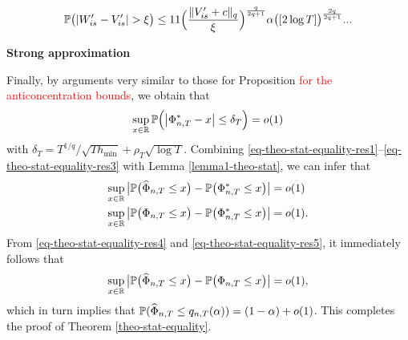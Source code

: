 \documentclass[a4paper,12pt]{article}
\begin{document}
\begin{align*}
\mathbb{P}\big(|W_{is}^\prime - V_{is}^\prime| > \xi \big) \le 11 \Big(\frac{\lVert V_{is}^\prime + c\rVert_q}{\xi}\Big)^{\frac{q}{2q+1}}\alpha\big([2\log T]\big)^{\frac{2q}{2q+1}}...
\end{align*}


\textbf{Strong approximation}

Finally, by arguments very similar to those for Proposition \textcolor{red}{for the anticoncentration bounds}, we obtain that 
\begin{equation}\label{eq-theo-stat-equality-res4}
\sup_{x \in \mathbb{R}} \mathbb{P} \Big( \big| \Phi_{n,T}^* - x \big| \le \delta_T \Big) = o(1) 
\end{equation}
with $\delta_T = T^{1/q} / \sqrt{T h_{\min}} + \rho_T \sqrt{\log T}$. Combining \eqref{eq-theo-stat-equality-res1}--\eqref{eq-theo-stat-equality-res3} with Lemma \ref{lemma1-theo-stat}, we can infer that 
\begin{align}
\sup_{x \in \mathbb{R}} \big| \mathbb{P} \big( \widehat{\Phi}_{n,T} \le x \big) -  \mathbb{P} \big( \Phi_{n,T}^* \le x \big) \big| & = o(1) \label{eq-theo-stat-equality-res4} \\
\sup_{x \in \mathbb{R}} \big| \mathbb{P} \big( \Phi_{n,T} \le x \big) -  \mathbb{P} \big( \Phi_{n,T}^* \le x \big) \big| & = o(1). \label{eq-theo-stat-equality-res5}
\end{align}
From \eqref{eq-theo-stat-equality-res4} and \eqref{eq-theo-stat-equality-res5}, it immediately follows that 
\[ \sup_{x \in \mathbb{R}} \big| \mathbb{P} \big( \widehat{\Phi}_{n,T} \le x \big) -  \mathbb{P} \big( \Phi_{n,T} \le x \big) \big| = o(1), \]
which in turn implies that $\mathbb{P} ( \widehat{\Phi}_{n,T} \le q_{n,T}(\alpha) ) = (1 - \alpha) + o(1)$. This completes the proof of Theorem \ref{theo-stat-equality}. 


{\small
\setlength{\bibsep}{0.55em}
}
\end{document}
